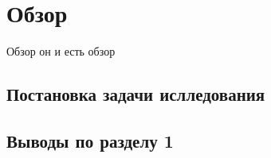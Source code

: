 \chapter{Обзор}

Обзор он и есть обзор

\section{Постановка задачи ислледования}

\section{Выводы по разделу 1}

